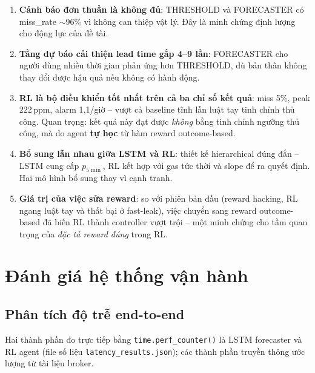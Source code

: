 \begin{enumerate}
  \item \textbf{Cảnh báo đơn thuần là không đủ}: THRESHOLD và FORECASTER có miss\_rate $\sim$96\% vì không can thiệp vật lý. Đây là minh chứng định lượng cho động lực của đề tài.

  \item \textbf{Tầng dự báo cải thiện lead time gấp 4--9 lần}: FORECASTER cho người dùng nhiều thời gian phản ứng hơn THRESHOLD, dù bản thân không thay đổi được hậu quả nếu không có hành động.

  \item \textbf{RL là bộ điều khiển tốt nhất trên cả ba chỉ số kết quả}: miss 5\%, peak 222\,ppm, alarm 1{,}1/giờ -- vượt cả baseline tĩnh lẫn luật tay tinh chỉnh thủ công. Quan trọng: kết quả này đạt được \emph{không} bằng tinh chỉnh ngưỡng thủ công, mà do agent \textbf{tự học} từ hàm reward outcome-based.

  \item \textbf{Bổ sung lẫn nhau giữa LSTM và RL}: thiết kế hierarchical đúng đắn -- LSTM cung cấp $p_{5\min}$, RL kết hợp với gas tức thời và slope để ra quyết định. Hai mô hình bổ sung thay vì cạnh tranh.

  \item \textbf{Giá trị của việc sửa reward}: so với phiên bản đầu (reward hacking, RL ngang luật tay và thất bại ở fast-leak), việc chuyển sang reward outcome-based đã biến RL thành controller vượt trội -- một minh chứng cho tầm quan trọng của \emph{đặc tả reward đúng} trong RL.
\end{enumerate}

\section{Đánh giá hệ thống vận hành}

\subsection{Phân tích độ trễ end-to-end}

Hai thành phần đo trực tiếp bằng \texttt{time.perf\_counter()} là LSTM forecaster và RL agent (file số liệu \texttt{latency\_results.json}); các thành phần truyền thông ước lượng từ tài liệu broker.

